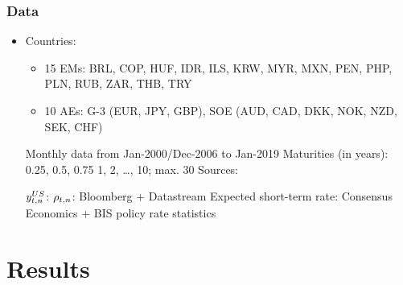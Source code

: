 \documentclass[12pt, aspectratio=169, xcolor=dvipsnames]{beamer}  %
\begin{document}
\begin{frame}
	\frametitle{Data}
	\begin{itemize}
		\item Countries:
		\begin{itemize}
			\item \scriptsize \alert{15 EMs}: BRL, COP, HUF, IDR, ILS, KRW, MYR, MXN, PEN, PHP, PLN, RUB, ZAR, THB, TRY
			\item \scriptsize \alert{10 AEs}: G-3 (EUR, JPY, GBP), SOE (AUD, CAD, DKK, NOK, NZD, SEK, CHF)
		\end{itemize}
		\iftoggle{struct}{\item<2->}{\item} Monthly data from Jan-2000/Dec-2006 to Jan-2019
		\iftoggle{struct}{\item<3->}{\item} Maturities (in years): 0.25, 0.5, 0.75 1, 2, \ldots, 10; max. 30
		\iftoggle{struct}{\item<4->}{\item} Sources:
		\begin{itemize}
			\iftoggle{struct}{\item<5->}{\item} $y_{t,n} ^{US}$: \citet*{GSW:2007}
			\vspace{-0.1cm}
			\iftoggle{struct}{\item<6->}{\item} $\rho_{t,n}$: Bloomberg $+$ Datastream
			\vspace{-0.1cm}
			\iftoggle{struct}{\item<7->}{\item} Expected short-term rate: Consensus Economics $+$ BIS policy rate statistics
		\end{itemize}
	\end{itemize}
\end{frame}

\section{Results}
\end{document}

